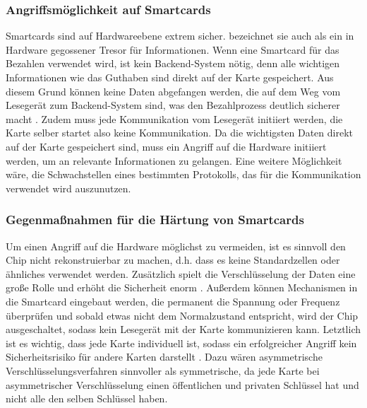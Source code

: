 \subsubsection{Angriffsmöglichkeit auf Smartcards}
Smartcards sind auf Hardwareebene extrem sicher. \cite{refmas:ASSS} bezeichnet sie auch als ein in Hardware gegossener
Tresor für Informationen. Wenn eine Smartcard für das Bezahlen verwendet wird, ist kein Backend-System nötig,
denn alle wichtigen Informationen wie das Guthaben sind direkt auf der Karte gespeichert. Aus diesem Grund können
keine Daten abgefangen werden, die auf dem Weg vom Lesegerät zum Backend-System sind, was den Bezahlprozess
deutlich sicherer macht \cite{refbook:WRHC}. Zudem muss jede Kommunikation vom Lesegerät initiiert werden, 
die Karte selber startet also keine Kommunikation. Da die wichtigsten Daten direkt auf der Karte gespeichert sind,
muss ein Angriff auf die Hardware initiiert werden, um an relevante Informationen zu gelangen. Eine weitere 
Möglichkeit wäre, die Schwachstellen eines bestimmten Protokolls, das für die Kommunikation verwendet wird auszunutzen.

\subsubsection{Gegenmaßnahmen für die Härtung von Smartcards}
Um einen Angriff auf die Hardware möglichst zu vermeiden, ist es sinnvoll den Chip nicht rekonstruierbar zu machen,
d.h. dass es keine Standardzellen oder ähnliches verwendet werden. Zusätzlich spielt die Verschlüsselung 
der Daten eine große Rolle und erhöht die Sicherheit enorm \cite{refst:ARES}. Außerdem können Mechanismen in 
die Smartcard eingebaut werden, die permanent die Spannung oder Frequenz überprüfen und sobald etwas
nicht dem Normalzustand entspricht, wird der Chip ausgeschaltet, sodass kein Lesegerät mit der 
Karte kommunizieren kann. Letztlich ist es wichtig, dass jede Karte individuell ist, sodass ein 
erfolgreicher Angriff kein Sicherheitsrisiko für andere Karten darstellt \cite{refmas:ASSS}. 
Dazu wären asymmetrische Verschlüsselungsverfahren sinnvoller als symmetrische, da jede Karte bei
asymmetrischer Verschlüsselung einen öffentlichen und privaten Schlüssel hat und nicht alle den
selben Schlüssel haben.


